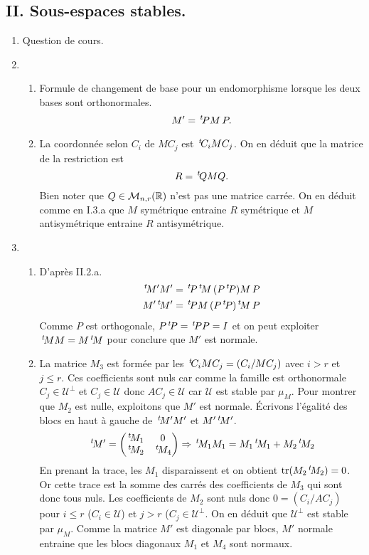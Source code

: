 \subsection*{II. Sous-espaces stables.}
\begin{enumerate}
 \item Question de cours.

 \item
\begin{enumerate}
 \item Formule de changement de base pour un endomorphisme lorsque les deux bases sont orthonormales.
\[
 M' = \,\mathstrut^t\!{P} M\, P.
\]

 \item La coordonnée selon $C_i$ de $M C_j$ est $\,\mathstrut^t\!{C_i} M C_j$. On en déduit que la matrice de la restriction est 
 \[
  R = \,\mathstrut^t\!{Q} M Q.
 \]
Bien noter que $Q \in \mathcal{M}_{n,r}(\mathbb{R})$ n'est pas une matrice carrée.\newline
On en déduit comme en I.3.a que $M$ symétrique entraine $R$ symétrique et $M$ antisymétrique entraine $R$ antisymétrique.
\end{enumerate}

 \item
\begin{enumerate}
 \item D'après II.2.a.
\[
\begin{aligned}
 \trans{M'}M' &= \trans{P} \trans{M}\, (P\trans{P}) M\, P \\
 M'\trans{M'} &= \trans{P} M\, (P\trans{P}) \trans{M}\, P
\end{aligned}
\]
Comme $P$ est orthogonale, $P\,\mathstrut^t\!{P} = \,\mathstrut^t\!{P} P =I$ et on peut exploiter $\,\mathstrut^t\!{M}M = M\,\mathstrut^t\!{M}$ pour conclure que $M'$ est normale.

 \item La matrice $M_3$ est formée par les $\,\mathstrut^t\!{C_i} M C_j = (C_i / M C_j)$ avec $i>r$ et $j\leq r$. Ces coefficients sont nuls car comme la famille est orthonormale $C_j \in \mathcal{U}^\bot$ et $C_j \in \mathcal{U}$ donc $AC_j \in \mathcal{U}$ car $\mathcal{U}$ est stable par $\mu_M$.\newline
 Pour montrer que $M_2$ est nulle, exploitons que $M'$ est normale. \'Ecrivons l'égalité des blocs en haut à gauche de $\,\mathstrut^t\!{M'}M'$ et $M' \,\mathstrut^t\!{M'}$.
\[
 \,\mathstrut^t\!{M'}=
 \begin{pmatrix}
  \,\mathstrut^t\!{M_1} & 0 \\ \,\mathstrut^t\!{M_2} & \,\mathstrut^t\!{M_4}
 \end{pmatrix}
\Rightarrow
\,\mathstrut^t\!{M_1} M_1 = M_1 \,\mathstrut^t\!{M_1} + M_2 \,\mathstrut^t\!{M_2}
\]
En prenant la trace, les $M_1$ disparaissent et on obtient $\operatorname{tr}(M_2 \,\mathstrut^t\!{M_2})=0$. Or cette trace est la somme des carrés des coefficients de $M_3$ qui sont donc tous nuls.\newline
Les coefficients de $M_2$ sont nuls donc $0 = (C_i / AC_j)$ pour $i \leq r$ ($C_i \in \mathcal{U}$) et $ j > r$ ($C_j \in \mathcal{U}^\bot$. On en déduit que $\mathcal{U}^\bot$ est stable par $\mu_M$.\newline
Comme la matrice $M'$ est diagonale par blocs, $M'$ normale entraine que les blocs diagonaux $M_1$ et $M_4$ sont normaux.
\end{enumerate}


\end{enumerate}
